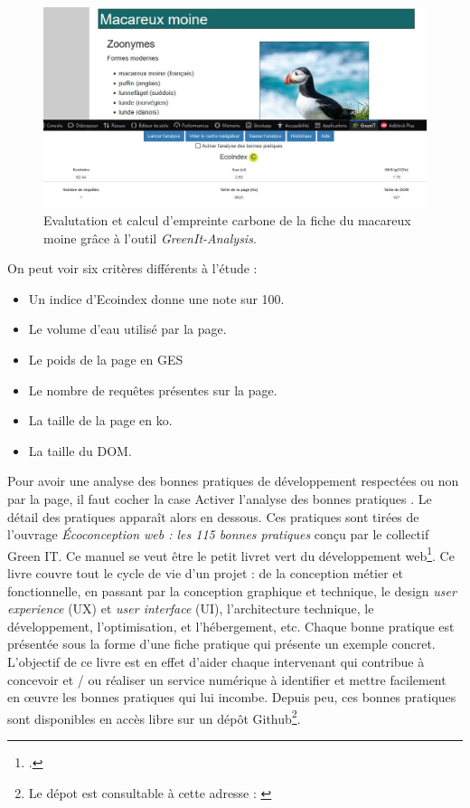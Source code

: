 \documentclass[a4paper,12pt,twoside]{book}
\begin{document}
\begin{figure}[H]
    \centering
    \includegraphics[width=\linewidth]{img/partie_3/greenit.JPG}
    \caption{Evalutation et calcul d'empreinte carbone de la fiche du macareux moine grâce à l'outil \textit{GreenIt-Analysis}.}
\end{figure}


On peut voir six critères différents à l'étude :
\begin{itemize}
    \item Un indice d'Ecoindex donne une note sur 100.
    \item Le volume d'eau utilisé par la page.
    \item Le poids de la page en \acrlong{GES}
    \item Le nombre de requêtes présentes sur la page.
    \item La taille de la page en ko.
    \item La taille du \acrshort{DOM}.
\end{itemize}

Pour avoir une analyse des bonnes pratiques de développement respectées ou non par la page, il faut cocher la case \og Activer l'analyse des bonnes pratiques \fg. Le détail des pratiques apparaît alors en dessous. Ces pratiques sont tirées de l'ouvrage \og \textit{Écoconception web : les 115 bonnes pratiques} \fg{} conçu par le collectif Green IT. Ce manuel se veut être le \og petit livret vert du développement web\fg\footcite{greenit}. Ce livre couvre tout le cycle de vie d’un projet : de la conception métier et fonctionnelle, en passant par la conception graphique et technique, le design \textit{user experience} (UX) et \textit{user interface} (UI), l'architecture technique, le développement, l'optimisation, et l'hébergement, etc. Chaque bonne pratique est présentée sous la forme d'une fiche pratique qui présente un exemple concret. L'objectif de ce livre est en effet d'aider chaque intervenant qui contribue à concevoir et / ou réaliser un service numérique à identifier et mettre facilement en \oe{}uvre les bonnes pratiques qui lui incombe. Depuis peu, ces bonnes pratiques sont disponibles en accès libre sur un dépôt Github\footnote{Le dépot est consultable à cette adresse : \cite{bonnes-pratiques}}.
\end{document}
